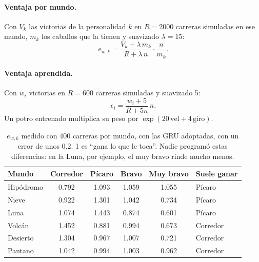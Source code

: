 \documentclass[11pt,letterpaper]{article}
\begin{document}
\paragraph{Ventaja por mundo.} Con $V_k$ las victorias de la personalidad $k$ en $R = 2000$ carreras simuladas en ese mundo, $m_k$ los caballos que la tienen y suavizado $\lambda = 15$:
\begin{equation}
e_{w,k} = \frac{V_k + \lambda\, m_k}{R + \lambda\, n} \cdot \frac{n}{m_k}.
\end{equation}

\paragraph{Ventaja aprendida.} Con $w_i$ victorias en $R = 600$ carreras simuladas y suavizado 5:
\begin{equation}
\epsilon_i = \frac{w_i + 5}{R + 5n}\, n.
\end{equation}
Un potro entrenado multiplica su peso por $\exp(20\,\text{vel} + 4\,\text{giro})$.

\begin{table}[h]
\centering
\begin{tabular}{lccccl}
\toprule
Mundo & Corredor & Pícaro & Bravo & Muy bravo & Suele ganar \\
\midrule
Hipódromo & 0.792 & 1.093 & 1.059 & 1.055 & Pícaro \\
Nieve & 0.922 & 1.301 & 1.042 & 0.734 & Pícaro \\
Luna & 1.074 & 1.443 & 0.874 & 0.601 & Pícaro \\
Volcán & 1.452 & 0.881 & 0.994 & 0.673 & Corredor \\
Desierto & 1.304 & 0.967 & 1.007 & 0.721 & Corredor \\
Pantano & 1.042 & 0.994 & 1.003 & 0.962 & Corredor \\
\bottomrule
\end{tabular}
\caption{$e_{w,k}$ medido con 400 carreras por mundo, con las GRU adoptadas, con un error de unos $0.2$. 1 es ``gana lo que le toca''. Nadie programó estas diferencias: en la Luna, por ejemplo, el muy bravo rinde mucho menos.}
\end{table}
\end{document}
